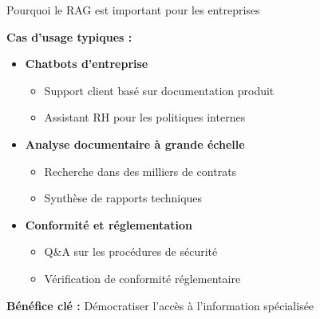 \begin{frame}{Pourquoi le RAG est important pour les entreprises}

\textbf{Cas d'usage typiques :}

\vspace{0.3cm}

\begin{itemize}
    \item<+-> \textbf{Chatbots d'entreprise}
        \begin{itemize}
            \item Support client basé sur documentation produit
            \item Assistant RH pour les politiques internes
        \end{itemize}

    \item<+-> \textbf{Analyse documentaire à grande échelle}
        \begin{itemize}
            \item Recherche dans des milliers de contrats
            \item Synthèse de rapports techniques
        \end{itemize}

    \item<+-> \textbf{Conformité et réglementation}
        \begin{itemize}
            \item Q\&A sur les procédures de sécurité
            \item Vérification de conformité réglementaire
        \end{itemize}
\end{itemize}

\vspace{0.3cm}
\textbf{Bénéfice clé :} Démocratiser l'accès à l'information spécialisée

\end{frame}

